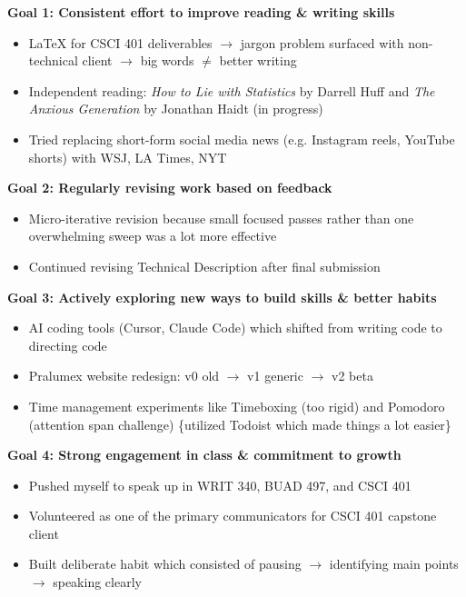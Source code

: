 \documentclass[10pt]{article}
\begin{document}
\vspace{3pt}
\begin{small}

\textbf{Goal 1: Consistent effort to improve reading \& writing skills}
\begin{itemize}
  \item \LaTeX{} for CSCI 401 deliverables $\to$ jargon problem surfaced with non-technical client $\to$ big words $\neq$ better writing
  \item Independent reading: \textit{How to Lie with Statistics} by Darrell Huff and \textit{The Anxious Generation} by Jonathan Haidt (in progress)
  \item Tried replacing short-form social media news (e.g. Instagram reels, YouTube shorts) with WSJ, LA Times, NYT
\end{itemize}

\vspace{2pt}
\textbf{Goal 2: Regularly revising work based on feedback}
\begin{itemize}
  \item Micro-iterative revision because small focused passes rather than one overwhelming sweep was a lot more effective
  \item Continued revising Technical Description after final submission
\end{itemize}

\vspace{2pt}
\textbf{Goal 3: Actively exploring new ways to build skills \& better habits}
\begin{itemize}
  \item AI coding tools (Cursor, Claude Code) which shifted from writing code to directing code
  \item Pralumex website redesign: v0 old $\to$ v1 generic $\to$ v2 beta
  \item Time management experiments like Timeboxing (too rigid) and Pomodoro (attention span challenge) \{utilized Todoist which made things a lot easier\}
\end{itemize}

\vspace{2pt}
\textbf{Goal 4: Strong engagement in class \& commitment to growth}
\begin{itemize}
  \item Pushed myself to speak up in WRIT 340, BUAD 497, and CSCI 401
  \item Volunteered as one of the primary communicators for CSCI 401 capstone client
  \item Built deliberate habit which consisted of pausing $\to$ identifying main points $\to$ speaking clearly
\end{itemize}


\end{small}
\end{document}
